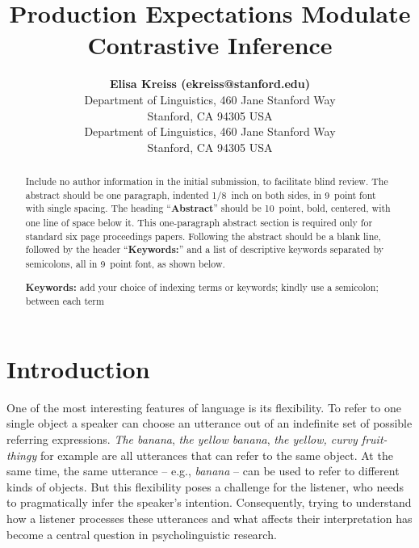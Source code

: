 \documentclass[10pt,letterpaper]{article}
\title{Production Expectations Modulate Contrastive Inference}
\author{{\large \bf Elisa Kreiss (ekreiss@stanford.edu)} \\
  Department of Linguistics, 460 Jane Stanford Way \\
  Stanford, CA 94305 USA
  \AND {\large \bf Judith Degen (jdegen@stanford.edu)} \\
  Department of Linguistics, 460 Jane Stanford Way \\
  Stanford, CA 94305 USA}
\newcommand{\jd}[1]{\textcolor{Purple}{[jd: #1]}}
\begin{document}
\maketitle

\begin{abstract}
Include no author information in the initial submission, to facilitate
blind review.  The abstract should be one paragraph, indented 1/8~inch on both sides,
in 9~point font with single spacing. The heading ``{\bf Abstract}''
should be 10~point, bold, centered, with one line of space below
it. This one-paragraph abstract section is required only for standard
six page proceedings papers. Following the abstract should be a blank
line, followed by the header ``{\bf Keywords:}'' and a list of
descriptive keywords separated by semicolons, all in 9~point font, as
shown below.

\textbf{Keywords:} 
add your choice of indexing terms or keywords; kindly use a
semicolon; between each term
\end{abstract}

\section{Introduction}

One of the most interesting features of language is its flexibility. To refer to one single object a speaker can choose an utterance out of an indefinite set of possible referring expressions. \textit{The banana}, \textit{the yellow banana}, \textit{the yellow, curvy fruit-thingy} for example are all utterances that can refer to the same object. At the same time, the same utterance -- e.g., \emph{banana} -- can be used to refer to different kinds of objects. But this flexibility poses a challenge for the listener, who needs to pragmatically infer the speaker's intention. Consequently, trying to understand how a listener processes these utterances and what affects their interpretation has become a central question in psycholinguistic research. 
\end{document}
